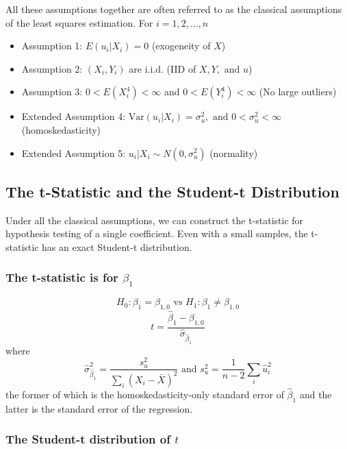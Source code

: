 \documentclass[a4paper,11pt]{article}
\newcommand{\var}{\mathrm{Var}}
\begin{document}
All these assumptions together are often referred to as the classical
assumptions of the least squares estimation. 
For \(i = 1, 2, \ldots, n\)
\begin{itemize}
\item Assumption 1: \(E(u_i | X_i) = 0\) (exogeneity of \(X\))
\item Assumption 2: \((X_i, Y_i)\) are i.i.d. (IID of \(X, Y, \text{ and }
                   u\))
\item Assumption 3: \(0 < E(X_i^4) < \infty\) and \(0 < E(Y_i^4) < \infty\)
(No large outliers)
\item Extended Assumption 4: \(\var(u_i | X_i) = \sigma^2_u, \text{ and } 0 <
                   \sigma^2_u < \infty\) (homoskedasticity)
\item Extended Assumption 5: \(u_i | X_i \sim N(0, \sigma^2_u)\) (normality)
\end{itemize}

\subsection{The t-Statistic and the Student-t Distribution}
\label{sec:org69b372d}
Under all the classical assumptions, we can construct the
t-statistic for hypothesis testing of a single coefficient. Even with
a small samples, the t-statistic has an exact Student-t distribution. 

\subsubsection*{The t-statistic is for \(\beta_1\)}
\label{sec:org503fd5d}

\[H_0: \beta_1 = \beta_{1,0} \text{ vs } H_1: \beta_1 \neq \beta_{1,0}\]
\begin{equation}
t = \frac{\hat{\beta}_1 - \beta_{1,0}}{\hat{\sigma}_{\hat{\beta}_1}}
\end{equation}
where
\begin{equation*}
\hat{\sigma}^2_{\hat{\beta}_1} = \frac{s^2_u}{\sum_i (X_i - \bar{X})^2} \text{ and } s^2_u = \frac{1}{n-2}\sum_i \hat{u}_i^2
\end{equation*}
the former of which is the homoskedasticity-only standard error of
\(\hat{\beta}_1\) and the latter is the standard error of the
regression. 

\subsubsection*{The Student-t distribution of \(t\)}
\label{sec:org86d2817}
\end{document}
